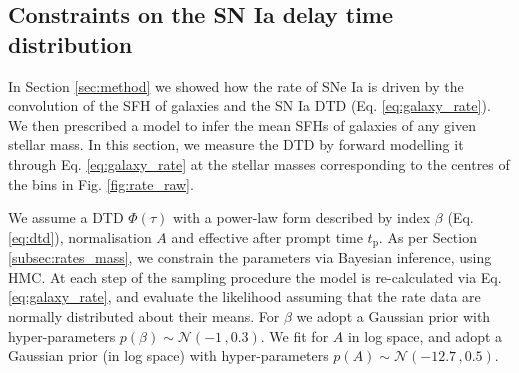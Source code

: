 \documentclass[fleqn,usenatbib]{mnras}
\begin{document}

\subsection{Constraints on the SN Ia delay time distribution}
\label{subsec:results_dtd}

In Section \ref{sec:method} we showed how the rate of SNe Ia is driven by the convolution of the SFH of galaxies and the SN Ia DTD (Eq. \ref{eq:galaxy_rate}). We then prescribed a model to infer the mean SFHs of galaxies of any given stellar mass. In this section, we measure the DTD by forward modelling it through Eq. \ref{eq:galaxy_rate} at the stellar masses corresponding to the centres of the bins in Fig. \ref{fig:rate_raw}. 

We assume a DTD $\Phi(\tau)$ with a power-law form described by index $\beta$ (Eq. \ref{eq:dtd}), normalisation $A$ and effective after prompt time $t_{\mathrm{p}}$. As per Section \ref{subsec:rates_mass}, we constrain the parameters via Bayesian inference, using HMC. At each step of the sampling procedure the model is re-calculated via Eq. \ref{eq:galaxy_rate}, and evaluate the likelihood assuming that the rate data are normally distributed about their means. For $\beta$ we adopt a Gaussian prior with hyper-parameters $p(\beta) \sim \mathcal{N}(-1\,,0.3)$. We fit for $A$ in log space, and adopt a Gaussian prior (in log space) with hyper-parameters $p(A) \sim \mathcal{N}(-12.7\,, 0.5)$.
\end{document}
